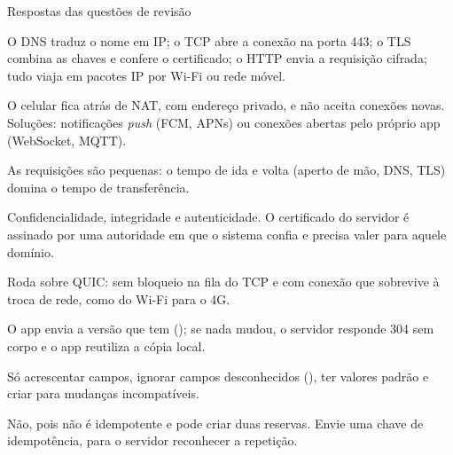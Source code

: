 \documentclass[aspectratio=169,10pt]{beamer}
\begin{document}
\begin{frame}{Respostas das questões de revisão}
  \begin{respostas}
    \item O DNS traduz o nome em IP; o TCP abre a conexão na porta 443; o TLS combina as chaves e confere o certificado; o HTTP envia a requisição cifrada; tudo viaja em pacotes IP por Wi-Fi ou rede móvel.
    \item O celular fica atrás de NAT, com endereço privado, e não aceita conexões novas. Soluções: notificações \emph{push} (FCM, APNs) ou conexões abertas pelo próprio app (WebSocket, MQTT).
    \item As requisições são pequenas: o tempo de ida e volta (aperto de mão, DNS, TLS) domina o tempo de transferência.
    \item Confidencialidade, integridade e autenticidade. O certificado do servidor é assinado por uma autoridade em que o sistema confia e precisa valer para aquele domínio.
    \item Roda sobre QUIC: sem bloqueio na fila do TCP e com conexão que sobrevive à troca de rede, como do Wi-Fi para o 4G.
    \item O app envia a versão que tem (); se nada mudou, o servidor responde 304 sem corpo e o app reutiliza a cópia local.
    \item Só acrescentar campos, ignorar campos desconhecidos (), ter valores padrão e criar  para mudanças incompatíveis.
    \item Não, pois  não é idempotente e pode criar duas reservas. Envie uma chave de idempotência, para o servidor reconhecer a repetição.
  \end{respostas}
\end{frame}

\end{document}
